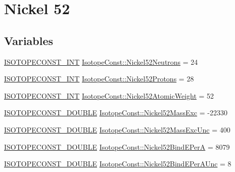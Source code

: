 \hypertarget{group___isotope_const-_nickel-_ni52}{}\section{Nickel 52}
\label{group___isotope_const-_nickel-_ni52}
\subsection*{Variables}
\begin{DoxyCompactItemize}
\item 
\mbox{\hyperlink{group___isotope_const-_macros_ga5f18360b3e99483a35c32d789e62621c}{I\+S\+O\+T\+O\+P\+E\+C\+O\+N\+S\+T\+\_\+\+I\+NT}} \mbox{\hyperlink{group___isotope_const-_nickel-_ni52_gafe72559c016f97888d2b35afd0a0a7df}{Isotope\+Const\+::\+Nickel52\+Neutrons}} = 24
\item 
\mbox{\hyperlink{group___isotope_const-_macros_ga5f18360b3e99483a35c32d789e62621c}{I\+S\+O\+T\+O\+P\+E\+C\+O\+N\+S\+T\+\_\+\+I\+NT}} \mbox{\hyperlink{group___isotope_const-_nickel-_ni52_gac5a830bdfa5b971131331df72d2f60d5}{Isotope\+Const\+::\+Nickel52\+Protons}} = 28
\item 
\mbox{\hyperlink{group___isotope_const-_macros_ga5f18360b3e99483a35c32d789e62621c}{I\+S\+O\+T\+O\+P\+E\+C\+O\+N\+S\+T\+\_\+\+I\+NT}} \mbox{\hyperlink{group___isotope_const-_nickel-_ni52_gaa3fead71833b9c4c71b7d407989d7be8}{Isotope\+Const\+::\+Nickel52\+Atomic\+Weight}} = 52
\item 
\mbox{\hyperlink{group___isotope_const-_macros_ga8f45a7272ce02c0b4c65c44636ed719a}{I\+S\+O\+T\+O\+P\+E\+C\+O\+N\+S\+T\+\_\+\+D\+O\+U\+B\+LE}} \mbox{\hyperlink{group___isotope_const-_nickel-_ni52_gada5faa9fdf45e247d8018020057e937f}{Isotope\+Const\+::\+Nickel52\+Mass\+Exc}} = -\/22330
\item 
\mbox{\hyperlink{group___isotope_const-_macros_ga8f45a7272ce02c0b4c65c44636ed719a}{I\+S\+O\+T\+O\+P\+E\+C\+O\+N\+S\+T\+\_\+\+D\+O\+U\+B\+LE}} \mbox{\hyperlink{group___isotope_const-_nickel-_ni52_ga40037dfd1525bc738a462c22b8337b26}{Isotope\+Const\+::\+Nickel52\+Mass\+Exc\+Unc}} = 400
\item 
\mbox{\hyperlink{group___isotope_const-_macros_ga8f45a7272ce02c0b4c65c44636ed719a}{I\+S\+O\+T\+O\+P\+E\+C\+O\+N\+S\+T\+\_\+\+D\+O\+U\+B\+LE}} \mbox{\hyperlink{group___isotope_const-_nickel-_ni52_ga3089e0386d36471b815019b768d2f281}{Isotope\+Const\+::\+Nickel52\+Bind\+E\+PerA}} = 8079
\item 
\mbox{\hyperlink{group___isotope_const-_macros_ga8f45a7272ce02c0b4c65c44636ed719a}{I\+S\+O\+T\+O\+P\+E\+C\+O\+N\+S\+T\+\_\+\+D\+O\+U\+B\+LE}} \mbox{\hyperlink{group___isotope_const-_nickel-_ni52_ga7d03208ae722fdec4a2853d51a340ce8}{Isotope\+Const\+::\+Nickel52\+Bind\+E\+Per\+A\+Unc}} = 8

\end{DoxyCompactItemize}
